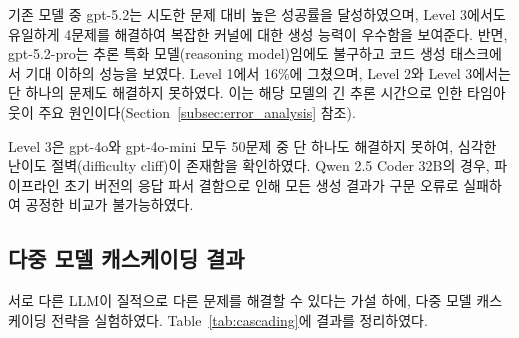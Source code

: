 \documentclass[sigplan,screen,review,anonymous]{acmart}
\begin{document}
기존 모델 중 gpt-5.2는 시도한 문제 대비 높은 성공률을 달성하였으며, Level 3에서도 유일하게 4문제를 해결하여 복잡한 커널에 대한 생성 능력이 우수함을 보여준다. 반면, gpt-5.2-pro는 추론 특화 모델(reasoning model)임에도 불구하고 코드 생성 태스크에서 기대 이하의 성능을 보였다. Level 1에서 16\%에 그쳤으며, Level 2와 Level 3에서는 단 하나의 문제도 해결하지 못하였다. 이는 해당 모델의 긴 추론 시간으로 인한 타임아웃이 주요 원인이다(Section~\ref{subsec:error_analysis} 참조).

Level 3은 gpt-4o와 gpt-4o-mini 모두 50문제 중 단 하나도 해결하지 못하여, 심각한 난이도 절벽(difficulty cliff)이 존재함을 확인하였다. Qwen 2.5 Coder 32B의 경우, 파이프라인 초기 버전의 응답 파서 결함으로 인해 모든 생성 결과가 구문 오류로 실패하여 공정한 비교가 불가능하였다.

\subsection{다중 모델 캐스케이딩 결과}

서로 다른 LLM이 질적으로 다른 문제를 해결할 수 있다는 가설 하에, 다중 모델 캐스케이딩 전략을 실험하였다. Table~\ref{tab:cascading}에 결과를 정리하였다.

\begin{table}[t]
\centering
\caption{다중 모델 캐스케이딩 전략의 누적 성능.}
\label{tab:cascading}
\end{table}


\end{document}
